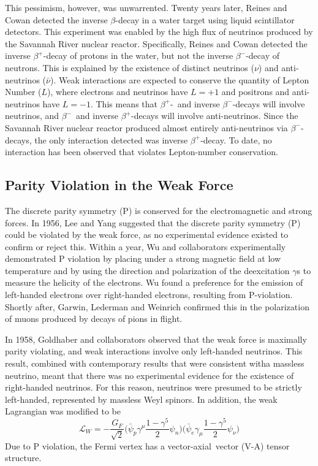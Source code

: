 \documentclass[/main.tex]{subfiles}
\begin{document}
This pessimism, however, was unwarrented.
Twenty years later, Reines and Cowan detected the inverse $\beta$-decay in a water target using liquid scintillator detectors\cite{Cowan1957}.
This experiment was enabled by the high flux of neutrinos produced by the Savannah River nuclear reactor.
Specifically, Reines and Cowan detected the inverse $\beta^+$-decay of protons in the water, but not the inverse $\beta^-$-decay of neutrons.
This is explained by the existence of distinct neutrinos ($\nu$) and anti-neutrinos ($\bar{\nu}$).
Weak interactions are expected to conserve the quantity of Lepton Number ($L$), where electrons and neutrinos have $L=+1$ and positrons and anti-neutrinos have $L=-1$.
This means that $\beta^+$-~and inverse $\beta^-$-decays will involve neutrinos, and $\beta^-$~and inverse $\beta^+$-decays will involve anti-neutrinos.
Since the Savannah River nuclear reactor produced almost entirely anti-neutrinos via $\beta^-$-decays, the only interaction detected was inverse $\beta^+$-decay.
To date, no interaction has been observed that violates Lepton-number conservation.

\subsection{Parity Violation in the Weak Force}
The discrete parity symmetry (P) is conserved for the electromagnetic and strong forces.
In 1956, Lee and Yang suggested that the discrete parity symmetry (P) could be violated by the weak force, as no experimental evidence existed to confirm or reject this\cite{LeeYang1956}.
Within a year, Wu and collaborators experimentally demonstrated P violation by placing  under a strong magnetic field at low temperature and by using the direction and polarization of the deexcitation $\gamma$s to measure the helicity of the electrons.
Wu found a preference for the emission of left-handed electrons over right-handed electrons, resulting from P-violation\cite{Wu1957}.
Shortly after, Garwin, Lederman and Weinrich confirmed this in the polarization of muons produced by decays of pions in flight\cite{Garwin1957}.

In 1958, Goldhaber and collaborators observed that the weak force is maximally parity violating, and weak interactions involve only left-handed neutrinos\cite{Goldhaber1958}.
This result, combined with contemporary results that were consistent witha massless neutrino\cite{PDG2018}, meant that there was no experimental evidence for the existence of right-handed neutrinos.
For this reason, neutrinos were presumed to be strictly left-handed, represented by massless Weyl spinors.
In addition, the weak Lagrangian was modified to be
\begin{equation}
  \mathcal{L}_W=-\frac{G_F}{\sqrt{2}}\big(\bar \psi_p \gamma^\mu \frac{1-\gamma^5}{2} \psi_n\big)\big(\bar \psi_e \gamma_\mu \frac{1-\gamma^5}{2} \psi_\nu\big)
\end{equation}
Due to P violation, the Fermi vertex has a vector-axial~vector (V-A) tensor structure.
\end{document}
